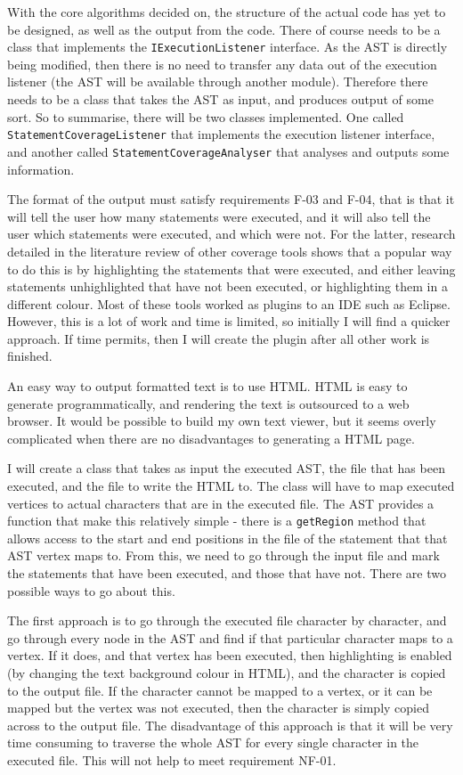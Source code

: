 With the core algorithms decided on, the structure of the actual code has yet to be designed, as well as the output from the code. There of course needs to be a class that implements the \verb|IExecutionListener| interface. As the AST is directly being modified, then there is no need to transfer any data out of the execution listener (the AST will be available through another module). Therefore there needs to be a class that takes the AST as input, and produces output of some sort. So to summarise, there will be two classes implemented. One called \verb|StatementCoverageListener| that implements the execution listener interface, and another called \verb|StatementCoverageAnalyser| that analyses and outputs some information.

The format of the output must satisfy requirements F-03 and F-04, that is that it will tell the user how many statements were executed, and it will also tell the user which statements were executed, and which were not. For the latter, research detailed in the literature review of other coverage tools shows that a popular way to do this is by highlighting the statements that were executed, and either leaving statements unhighlighted that have not been executed, or highlighting them in a different colour. Most of these tools worked as plugins to an IDE such as Eclipse. However, this is a lot of work and time is limited, so initially I will find a quicker approach. If time permits, then I will create the plugin after all other work is finished.

An easy way to output formatted text is to use HTML. HTML is easy to generate programmatically, and rendering the text is outsourced to a web browser. It would be possible to build my own text viewer, but it seems overly complicated when there are no disadvantages to generating a HTML page.

I will create a class that takes as input the executed AST, the file that has been executed, and the file to write the HTML to. The class will have to map executed vertices to actual characters that are in the executed file. The AST provides a function that make this relatively simple - there is a \verb|getRegion| method that allows access to the start and end positions in the file of the statement that that AST vertex maps to. From this, we need to go through the input file and mark the statements that have been executed, and those that have not. There are two possible ways to go about this. 

The first approach is to go through the executed file character by character, and go through every node in the AST and find if that particular character maps to a vertex. If it does, and that vertex has been executed, then highlighting is enabled (by changing the text background colour in HTML), and the character is copied to the output file. If the character cannot be mapped to a vertex, or it can be mapped but the vertex was not executed, then the character is simply copied across to the output file. The disadvantage of this approach is that it will be very time consuming to traverse the whole AST for every single character in the executed file. This will not help to meet requirement NF-01.

